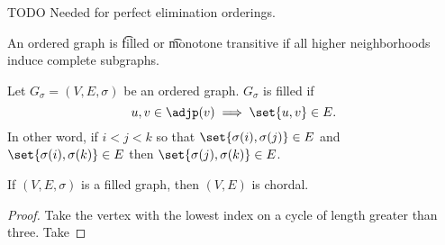 

TODO
Needed for perfect elimination orderings.


An ordered graph is \t{filled} or \t{monotone transitive} if all higher neighborhoods induce complete subgraphs.


Let $G_{\sigma} = (V, E, \sigma)$ be an ordered graph.
$G_{\sigma}$ is filled if
$$
  u, v \in \adjp(v) \implies \set{u, v} \in E.
$$
In other word, if $i < j < k$ so that $\set{\sigma(i), \sigma(j)} \in E$ and $\set{\sigma(i), \sigma(k)} \in E$ then $\set{\sigma(j), \sigma(k)} \in E$.


\begin{prop}
  If $(V, E, \sigma)$ is a filled graph, then $(V, E)$ is chordal.

  \begin{proof}
  Take the vertex with the lowest index on a cycle of length greater than three.
  Take
  \end{proof}
\end{prop}
